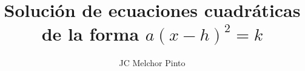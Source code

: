 \documentclass[12pt,addpoints,answers]{guia}
\title{Solución de ecuaciones cuadráticas de la forma $a(x-h)^2=k$}
\author{JC Melchor Pinto}
\begin{document}
\pagestyle{headandfoot}
\INFO%
\begin{multicols}{2}%
\end{multicols}%
\begin{questions}
    \questionboxed[10]{}
    \questionboxed[10]{}
    \questionboxed[10]{}
    \questionboxed[10]{}
    \questionboxed[10]{}
    \questionboxed[10]{}
    \questionboxed[10]{}
    \questionboxed[10]{}
    \questionboxed[10]{}
    \questionboxed[10]{}
\end{questions}
\end{document}
